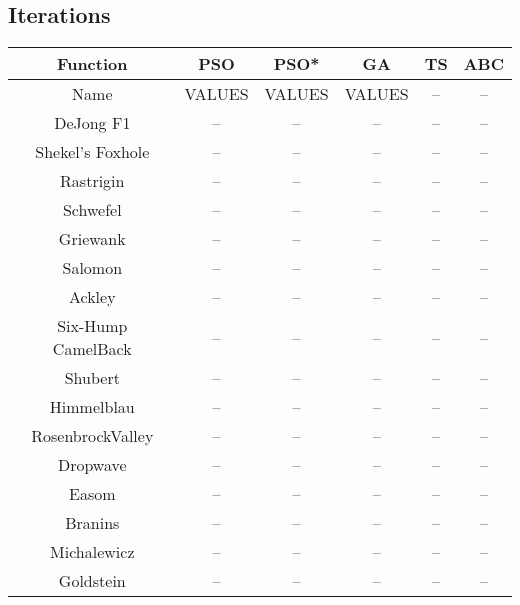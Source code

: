 \subsection{Iterations}
\begin{center}
	\begin{tabular}{| c | c | c | c | c | c |}
	\hline
	Function & PSO & PSO* & GA & TS & ABC\\  \hline
	Name & VALUES & VALUES & VALUES\cite{} & -- & --\\ \hline
	DeJong F1 & -- & -- & -- & -- & --\\ \hline
	Shekel's Foxhole & -- & -- & -- & -- & --\\ \hline
	Rastrigin & -- & -- & -- & -- & --\\ \hline
	Schwefel & -- & -- & -- & -- & --\\ \hline
	Griewank & -- & -- & -- & -- & --\\ \hline
	Salomon & -- & -- & -- & -- & --\\ \hline
	Ackley & -- & -- & -- & -- & --\\ \hline
	Six-Hump CamelBack & -- & -- & -- & -- & --\\ \hline
	Shubert & -- & -- & -- & -- & --\\ \hline
	Himmelblau & -- & -- & -- & -- & --\\ \hline
	RosenbrockValley & -- & -- & -- & -- & --\\ \hline
	Dropwave & -- & -- & -- & -- & --\\ \hline
	Easom & -- & -- & -- & -- & --\\ \hline
	Branins & -- & -- & -- & -- & --\\ \hline
	Michalewicz & -- & -- & -- & -- & --\\ \hline
	Goldstein & -- & -- & -- & -- & --\\ \hline
	\end{tabular}
\end{center}
